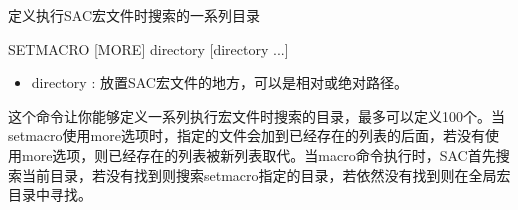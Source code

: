 \label{cmd:setmacro}

定义执行SAC宏文件时搜索的一系列目录

\begin{SACSTX}
SETMACRO  [MORE] directory [directory ...]
\end{SACSTX}

\begin{itemize}
\item directory : 放置SAC宏文件的地方，可以是相对或绝对路径。
\end{itemize}

这个命令让你能够定义一系列执行宏文件时搜索的目录，最多可以定义100个。当setmacro使用more选项时，指定的文件会加到已经存在的列表的后面，若没有使用more选项，则已经存在的列表被新列表取代。当macro命令执行时，SAC首先搜索当前目录，若没有找到则搜索setmacro指定的目录，若依然没有找到则在全局宏目录中寻找。

